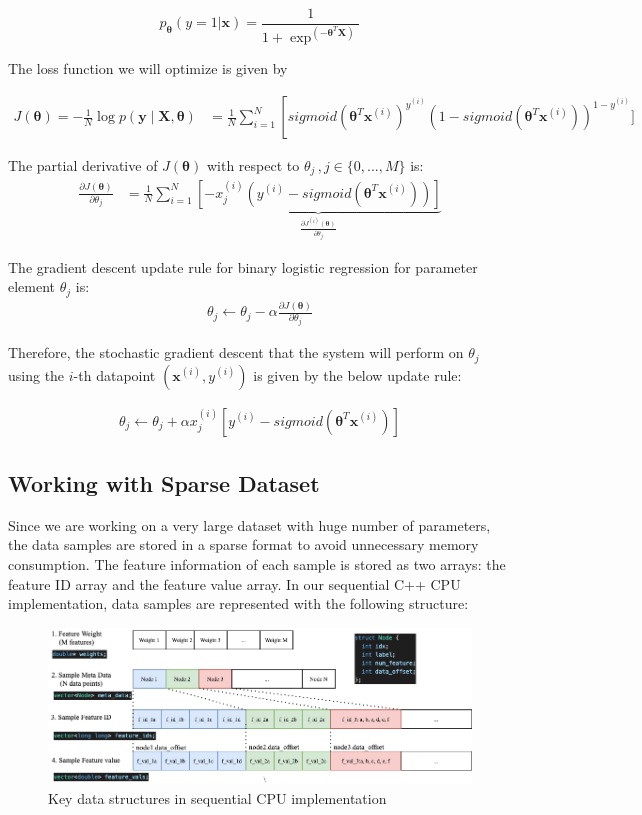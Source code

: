 \documentclass{article}
\newcommand{\xv}{\mathbf{x}}
\newcommand{\yv}{\mathbf{y}}
\newcommand{\Xv}{\mathbf{X}}
\newcommand{\thetav     }{\boldsymbol \theta     }
\begin{document}
$$
p_\thetav(y = 1 |\xv) = \frac{1}{1+\exp^{(-\thetav^T \Xv)}}$$

The loss function we will optimize is given by

\begin{align}
    J(\thetav)= - \frac{1}{N} \log p\left(\yv \mid \mathbf{X},\thetav\right) &= \frac{1}{N}\sum_{i=1}^N \left[sigmoid(\thetav^T\xv^{\left(i\right)})^{y^{(i)}}(1 - sigmoid(\thetav^T\xv^{\left(i\right)}))^{1-y^{(i)}}]
\end{align}





The partial derivative of $J(\thetav)$ with respect to $\theta_j \,, j\in\{0,...,M\}$ is:
\begin{align}
    \frac{\partial J(\thetav)}{\partial \theta_j} &= \frac{1}{N} \sum_{i=1}^N \underbrace{\left[-x_j^{\left(i\right)}\left(y^{(i)}-sigmoid(\thetav^T\xv^{\left(i\right)})\right)\right]}_{\textstyle\frac{\partial J^{(i)}(\thetav)}{\partial \theta_j}}
\end{align}


The gradient descent update rule  for binary logistic regression for parameter element $\theta_j$ is:
\begin{align}
    \theta_j \leftarrow \theta_j - \alpha \frac{\partial J(\thetav)}{\partial \theta_j}
\end{align}


Therefore, the stochastic gradient descent that the system will perform on $\theta_j$ using the $i$-th datapoint $(\xv^{(i)},y^{(i)})$ is given by the below update rule:

\begin{align}
    \theta_j \leftarrow \theta_j + \alpha x_j^{\left(i\right)} \left[y^{(i)}-sigmoid(\thetav^T\xv^{\left(i\right)})\right]
\end{align}
 
\subsection*{Working with Sparse Dataset}
Since we are working on a very large dataset with huge number of parameters, the data samples are stored in a sparse format to avoid unnecessary memory consumption. The feature information of each sample is stored as two arrays: the feature ID array and the feature value array. In our sequential C++ CPU implementation, data samples are represented with the following structure:
\begin{figure}[htp]
    \centering
    \includegraphics[width=14cm]{cpu_data_structure.png}
    \caption{Key data structures in sequential CPU implementation}
\end{figure}
\end{document}
